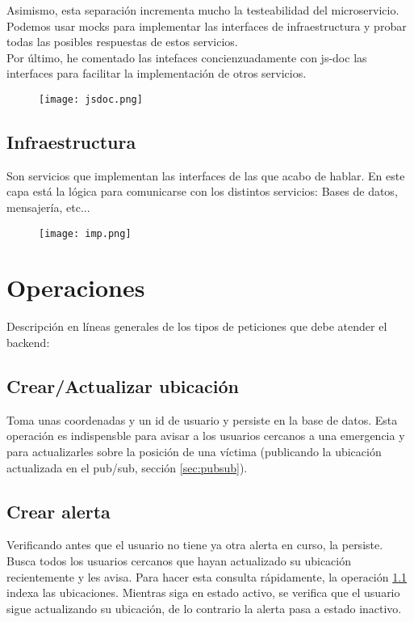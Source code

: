 Asimismo, esta separación incrementa mucho la testeabilidad del microservicio. Podemos usar mocks para implementar
las interfaces de infraestructura y probar todas las posibles respuestas de estos servicios. \\
Por último, he comentado las intefaces concienzuadamente con js-doc las interfaces para facilitar la implementación de otros servicios.
\begin{figure}[H]
	\centering	
	\texttt{[image: jsdoc.png]}
	\end{figure}

\subsection{Infraestructura} 
Son servicios que implementan las interfaces de las que acabo de hablar.
En este capa está la lógica para comunicarse con los distintos servicios: Bases de datos, mensajería, etc...
\begin{figure}[H]
	\centering	
	\texttt{[image: imp.png]}
	\end{figure}


\section{Operaciones}

Descripción en líneas generales de los tipos de peticiones que debe atender el backend:

\subsection{Crear/Actualizar ubicación}\label{op:ubi}
Toma unas coordenadas y un id de usuario y persiste en la base de datos.
Esta operación es indispensble para avisar a los usuarios cercanos a una emergencia y para 
actualizarles sobre la posición de una víctima (publicando la ubicación actualizada en el pub/sub, sección \ref{sec:pubsub}).

\subsection{Crear alerta}
Verificando antes que el usuario no tiene ya otra alerta en curso, la persiste.
Busca todos los usuarios cercanos que hayan actualizado su ubicación recientemente y les avisa. Para hacer
esta consulta rápidamente, la operación \ref{op:ubi} indexa las ubicaciones.
Mientras siga en estado activo, se verifica que el usuario sigue actualizando su ubicación, de lo contrario la alerta pasa a estado inactivo.

